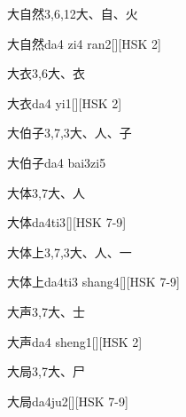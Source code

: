 \begin{Entry}{大自然}{3,6,12}{⼤、⾃、⽕}
  \begin{Phonetics}{大自然}{da4 zi4 ran2}[][HSK 2]
  \end{Phonetics}
\end{Entry}

\begin{Entry}{大衣}{3,6}{⼤、⾐}
  \begin{Phonetics}{大衣}{da4 yi1}[][HSK 2]
  \end{Phonetics}
\end{Entry}

\begin{Entry}{大伯子}{3,7,3}{⼤、⼈、⼦}
  \begin{Phonetics}{大伯子}{da4 bai3zi5}
  \end{Phonetics}
\end{Entry}

\begin{Entry}{大体}{3,7}{⼤、⼈}
  \begin{Phonetics}{大体}{da4ti3}[][HSK 7-9]
  \end{Phonetics}
\end{Entry}

\begin{Entry}{大体上}{3,7,3}{⼤、⼈、⼀}
  \begin{Phonetics}{大体上}{da4ti3 shang4}[][HSK 7-9]
  \end{Phonetics}
\end{Entry}

\begin{Entry}{大声}{3,7}{⼤、⼠}
  \begin{Phonetics}{大声}{da4 sheng1}[][HSK 2]
  \end{Phonetics}
\end{Entry}

\begin{Entry}{大局}{3,7}{⼤、⼫}
  \begin{Phonetics}{大局}{da4ju2}[][HSK 7-9]
  \end{Phonetics}
\end{Entry}

